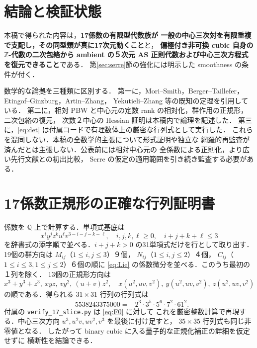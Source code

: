 \documentclass[11pt,a4paper]{ltjsarticle}
\numberwithin{equation}{section}
\begin{document}
\section{結論と検証状態}\label{sec:status}
本稿で得られた内容は，\textbf{17係数の有限型代数族が
一般の中心三次対を有限重複で支配し，その同型類が真に17次元動くこと}と，
\textbf{偏極付き非可換 cubic 自身の $\mathbb Z$-代数の二次包絡から
ambient の５次元 AS 正則代数および中心三次方程式を復元できること}である．
第\ref{sec:serre}節の強化には明示した smoothness の条件が付く．

数学的な論拠を三種類に区別する．
第一に，Mori--Smith，Berger--Taillefer，Etingof--Ginzburg，Artin--Zhang，
Yekutieli--Zhang 等の既知の定理を引用している．
第二に，相対 PBW と中心元の定数 rank の相対化，群作用の正規形，二次包絡の復元，
次数２中心の Hessian 証明は本稿内で論理を記述した．
第三に，\eqref{eq:det} は付属コードで有理数体上の厳密な行列式として実行した．
これらを混同しない．本稿の全数学的主張について形式証明や独立な
網羅的再監査が済んだとは主張しない．公表前には相対中心元の
全係数による正則化，より広い先行文献との初出比較，
Serre の仮定の適用範囲を引き続き監査する必要がある．

\appendix
\section{17係数正規形の正確な行列証明書}\label{app:rank}
係数を $\mathbb Q$ 上で計算する．単項式基底は
\[
 x^iy^jz^ku^\ell v^{3-i-j-k-\ell},\quad
 i,j,k,\ell\ge0,\quad i+j+k+\ell\le3
\]
を辞書式の添字順で並べる．$i+j+k>0$ の31単項式だけを行として取り出す．
19個の群方向は $M_{ij}$（$1\le i,j\le3$）９個，
$N_{ij}$（$1\le i,j\le2$）４個，
$C_{ij}$（$1\le i\le3,1\le j\le2$）６個の順に
\eqref{eq:Lie} の係数微分を並べる．このうち最初の１列を除く．
13個の正規形方向は
\[
 x^3+y^3+z^3,\ xyz,\ vy^2,\ (u+v)z^2,\quad
 x(u^2,uv,v^2),\ y(u^2,uv,v^2),\ z(u^2,uv,v^2)
\]
の順である．得られる $31\times31$ 行列の行列式は
\[
 -5538243375000=-2^3\cdot3^5\cdot5^6\cdot7^2\cdot61^2.
\]
付属の \texttt{verify\_17\_slice.py} は \eqref{eq:F0} に対して
これを厳密整数計算で再現する．中心三次方向
$u^3,u^2v,uv^2,v^3$ を最後に付け足すと，
$35\times35$ 行列式も同じ非零値となる．
したがって binary cubic に入る量子的な正規化補正の詳細を仮定せずに
横断性を結論できる．
\end{document}
